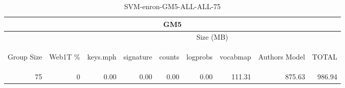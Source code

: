 \begin{center}
\begin{table}[htbp] 
 \begin{center}
\begin{tabular}{ | r | r | r | r | r | r | r | r | r |}
\hline
\multicolumn{9}{|c|}{GM5}\\
\hline
 & & \multicolumn{7}{|c|}{Size (MB)}\\ \cline{3-9}
\begin{sideways}Group Size\end{sideways} & \begin{sideways}Web1T \% \end{sideways} & \begin{sideways}keys.mph\end{sideways} & \begin{sideways}signature\end{sideways} & \begin{sideways}counts\end{sideways} & \begin{sideways}logprobs\end{sideways} & \begin{sideways}vocabmap\end{sideways} & \begin{sideways}Authors Model \end{sideways} & \begin{sideways}TOTAL\end{sideways}\\
\hline
\multirow{0}{*}{75}
 & 0 & 0.00 & 0.00 & 0.00 & 0.00 & 111.31 & 875.63 & 986.94\\ \cline{2-9}
\hline
\end{tabular}
\caption{SVM-enron-GM5-ALL-ALL-75}
\label{table:SVM-enron-GM5-ALL-ALL-75}
\end{center}
 \end{table}
\end{center}

